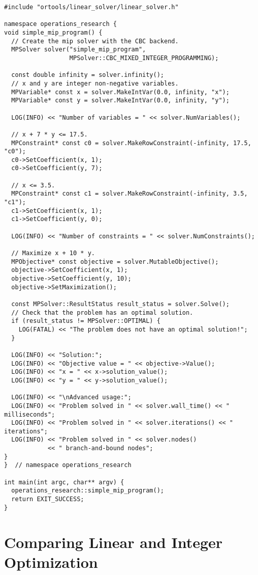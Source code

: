 \documentclass[a4paper,12pt,notitlepage,twoside,openright]{article}
\begin{document}
\begin{verbatim}
#include "ortools/linear_solver/linear_solver.h"

namespace operations_research {
void simple_mip_program() {
  // Create the mip solver with the CBC backend.
  MPSolver solver("simple_mip_program",
                  MPSolver::CBC_MIXED_INTEGER_PROGRAMMING);

  const double infinity = solver.infinity();
  // x and y are integer non-negative variables.
  MPVariable* const x = solver.MakeIntVar(0.0, infinity, "x");
  MPVariable* const y = solver.MakeIntVar(0.0, infinity, "y");

  LOG(INFO) << "Number of variables = " << solver.NumVariables();

  // x + 7 * y <= 17.5.
  MPConstraint* const c0 = solver.MakeRowConstraint(-infinity, 17.5, "c0");
  c0->SetCoefficient(x, 1);
  c0->SetCoefficient(y, 7);

  // x <= 3.5.
  MPConstraint* const c1 = solver.MakeRowConstraint(-infinity, 3.5, "c1");
  c1->SetCoefficient(x, 1);
  c1->SetCoefficient(y, 0);

  LOG(INFO) << "Number of constraints = " << solver.NumConstraints();

  // Maximize x + 10 * y.
  MPObjective* const objective = solver.MutableObjective();
  objective->SetCoefficient(x, 1);
  objective->SetCoefficient(y, 10);
  objective->SetMaximization();

  const MPSolver::ResultStatus result_status = solver.Solve();
  // Check that the problem has an optimal solution.
  if (result_status != MPSolver::OPTIMAL) {
    LOG(FATAL) << "The problem does not have an optimal solution!";
  }

  LOG(INFO) << "Solution:";
  LOG(INFO) << "Objective value = " << objective->Value();
  LOG(INFO) << "x = " << x->solution_value();
  LOG(INFO) << "y = " << y->solution_value();

  LOG(INFO) << "\nAdvanced usage:";
  LOG(INFO) << "Problem solved in " << solver.wall_time() << " milliseconds";
  LOG(INFO) << "Problem solved in " << solver.iterations() << " iterations";
  LOG(INFO) << "Problem solved in " << solver.nodes()
            << " branch-and-bound nodes";
}
}  // namespace operations_research

int main(int argc, char** argv) {
  operations_research::simple_mip_program();
  return EXIT_SUCCESS;
}
\end{verbatim}

\section{Comparing Linear and Integer Optimization}
\end{document}

